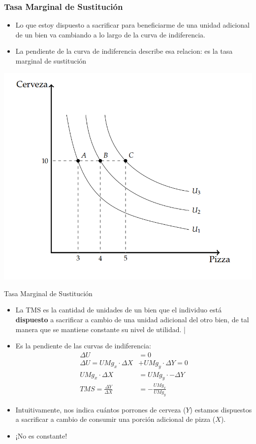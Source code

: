 \documentclass{beamer}
\begin{document}
\begin{frame}
\frametitle{Tasa Marginal de Sustitución}
\begin{itemize}
    \item Lo que estoy dispuesto a sacrificar para beneficiarme de una unidad adicional de un bien va cambiando a lo largo de la curva de indiferencia.
    \item La pendiente de la curva de indiferencia describe esa relacion: es la tasa marginal de sustitución
\end{itemize} 
\centering
\includegraphics[scale=0.5]{../Figures/C7.9.png}
\end{frame}

\begin{frame}{Tasa Marginal de Sustitución}
    \begin{itemize}
        \item La TMS es la cantidad de unidades de un bien que el individuo está \textbf{dispuesto} a sacrificar a cambio de una unidad adicional del otro bien, de tal manera que se mantiene constante su nivel de utilidad. \pause|
        \item Es la pendiente de las curvas de indiferencia:
        \begin{align*}
            \Delta U &= 0 \\
            \Delta U = UMg_x \cdot \Delta X &+ UMg_y \cdot \Delta Y = 0 \\
            UMg_x \cdot \Delta X &= UMg_y \cdot - \Delta Y \\
            TMS = \frac{\Delta Y}{\Delta X} &= - \frac{UMg_x}{UMg_y}
        \end{align*}    
        \item Intuitivamente, nos indica cuántos porrones de cerveza ($Y$) estamos dispuestos a sacrificar a cambio de consumir una porción adicional de pizza ($X$).
        \item ¡No es constante!
    \end{itemize} 
\end{frame}
\end{document}
